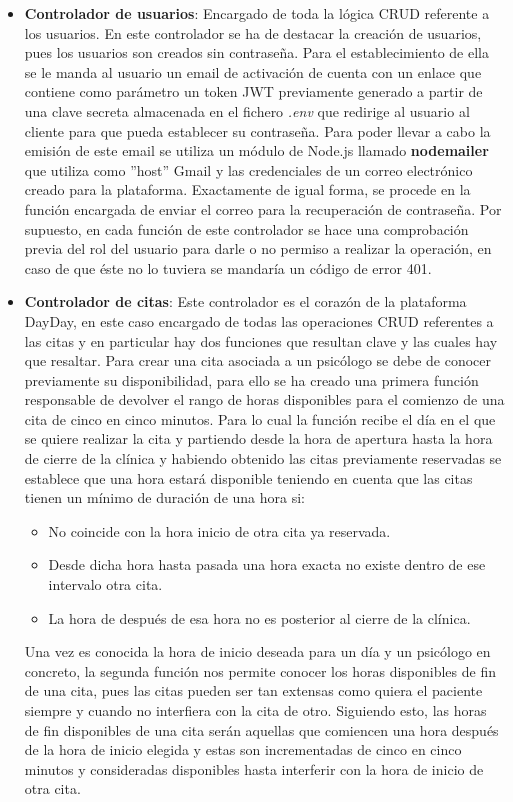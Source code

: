 \begin{itemize}
    \item \textbf{Controlador de usuarios}: Encargado de toda la lógica CRUD referente a los usuarios. En este controlador se ha de destacar la creación de usuarios, pues los usuarios son creados sin contraseña. Para el establecimiento de ella se le manda al usuario un email de activación de cuenta con un enlace que contiene como parámetro un token JWT previamente generado a partir de una clave secreta almacenada en el fichero \textit{.env} que redirige al usuario al cliente para que pueda establecer su contraseña. Para poder llevar a cabo la emisión de este email se utiliza un módulo de Node.js llamado \textbf{nodemailer} que utiliza como ''host'' Gmail y las credenciales de un correo electrónico creado para la plataforma. Exactamente de igual forma, se procede en la función encargada de enviar el correo para la recuperación de contraseña. Por supuesto, en cada función de este controlador se hace una comprobación previa del rol del usuario para darle o no permiso a realizar la operación, en caso de que éste no lo tuviera se mandaría un código de error 401.
    \item \textbf{Controlador de citas}: Este controlador es el corazón de la plataforma DayDay, en este caso encargado de todas las operaciones CRUD referentes a las citas y en particular hay dos funciones que resultan clave y las cuales hay que resaltar. Para crear una cita asociada a un psicólogo se debe de conocer previamente su disponibilidad, para ello se ha creado una primera función responsable de devolver el rango de horas disponibles para el comienzo de una cita de cinco en cinco minutos. Para lo cual la función recibe el día en el que se quiere realizar la cita y partiendo desde la hora de apertura hasta la hora de cierre de la clínica y habiendo obtenido las citas previamente reservadas se establece que una hora estará disponible teniendo en cuenta que las citas tienen un mínimo de duración de una hora si: 
    \begin{itemize}
        \item No coincide con la hora inicio de otra cita ya reservada.
        \item Desde dicha hora hasta pasada una hora exacta no existe dentro de ese intervalo otra cita.
        \item La hora de después de esa hora no es posterior al cierre de la clínica.
    \end{itemize}  
    Una vez es conocida la hora de inicio deseada para un día y un psicólogo en concreto, la segunda función nos permite conocer los horas disponibles de fin de una cita, pues las citas pueden ser tan extensas como quiera el paciente siempre y cuando no interfiera con la cita de otro. Siguiendo esto, las horas de fin disponibles de una cita serán aquellas que comiencen una hora después de la hora de inicio elegida y estas son incrementadas de cinco en cinco minutos y consideradas disponibles hasta interferir con la hora de inicio de otra cita.
\end{itemize}

